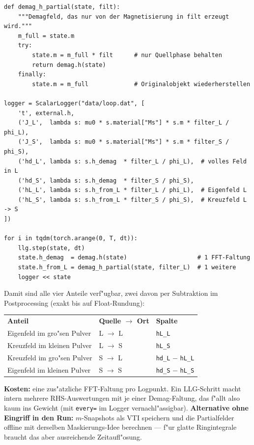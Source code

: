 \documentclass[11pt,a4paper]{article}
\begin{document}
\begin{lstlisting}
def demag_h_partial(state, filt):
    """Demagfeld, das nur von der Magnetisierung in filt erzeugt wird."""
    m_full = state.m
    try:
        state.m = m_full * filt      # nur Quellphase behalten
        return demag.h(state)
    finally:
        state.m = m_full             # Originalobjekt wiederherstellen

logger = ScalarLogger("data/loop.dat", [
    't', external.h,
    ('J_L',  lambda s: mu0 * s.material["Ms"] * s.m * filter_L / phi_L),
    ('J_S',  lambda s: mu0 * s.material["Ms"] * s.m * filter_S / phi_S),
    ('hd_L', lambda s: s.h_demag  * filter_L / phi_L),  # volles Feld in L
    ('hd_S', lambda s: s.h_demag  * filter_S / phi_S),
    ('hL_L', lambda s: s.h_from_L * filter_L / phi_L),  # Eigenfeld L
    ('hL_S', lambda s: s.h_from_L * filter_S / phi_S),  # Kreuzfeld L -> S
])

for i in tqdm(torch.arange(0, T, dt)):
    llg.step(state, dt)
    state.h_demag  = demag.h(state)                    # 1 FFT-Faltung
    state.h_from_L = demag_h_partial(state, filter_L)  # 1 weitere
    logger << state
\end{lstlisting}

Damit sind alle vier Anteile verf"ugbar, zwei davon per Subtraktion im Postprocessing (exakt bis auf Float-Rundung):
\begin{center}
\begin{tabular}{lll}
\textbf{Anteil} & \textbf{Quelle $\to$ Ort} & \textbf{Spalte} \\[2pt]
Eigenfeld im gro"sen Pulver   & L $\to$ L & \texttt{hL\_L} \\
Kreuzfeld im kleinen Pulver   & L $\to$ S & \texttt{hL\_S} \\
Kreuzfeld im gro"sen Pulver   & S $\to$ L & \texttt{hd\_L} $-$ \texttt{hL\_L} \\
Eigenfeld im kleinen Pulver   & S $\to$ S & \texttt{hd\_S} $-$ \texttt{hL\_S} \\
\end{tabular}
\end{center}

\textbf{Kosten:} eine zus"atzliche FFT-Faltung pro Logpunkt. Ein LLG-Schritt macht intern mehrere RHS-Auswertungen mit je einer Demag-Faltung, das f"allt also kaum ins Gewicht (mit \texttt{every=} im Logger vernachl"assigbar). \textbf{Alternative ohne Eingriff in den Run:} $m$-Snapshots als VTI speichern und die Partialfelder offline mit derselben Maskierungs-Idee berechnen --- f"ur glatte Ringintegrale braucht das aber ausreichende Zeitaufl"osung.
\end{document}

